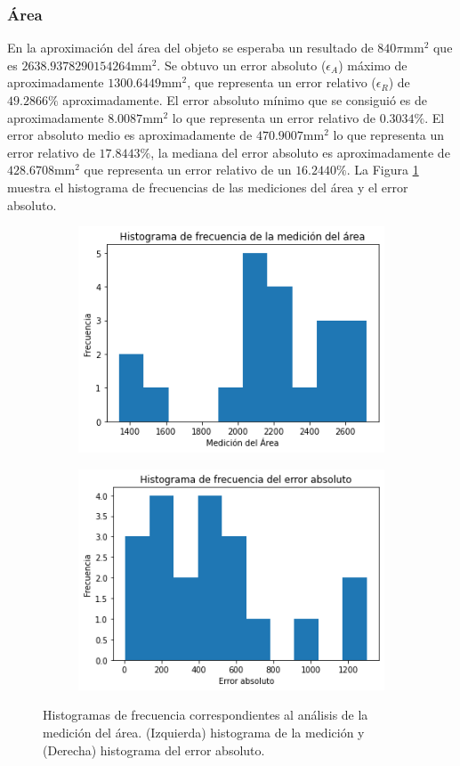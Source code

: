 \subsubsection{Área}

En la aproximación del área del objeto se esperaba un resultado de $840\pi\text{mm}^2$ que es $2638.9378290154264\text{mm}^2$. Se obtuvo un error absoluto ($\epsilon_A$) máximo de aproximadamente $1300.6449\text{mm}^2$, que representa un error relativo ($\epsilon_R$) de $49.2866\%$ aproximadamente. El error absoluto mínimo que se consiguió es de aproximadamente $8.0087\text{mm}^2$ lo que representa un error relativo de $0.3034\%$. El error absoluto medio es aproximadamente de $470.9007\text{mm}^2$ lo que representa un error relativo de $17.8443\%$, la mediana del error absoluto es aproximadamente de $428.6708\text{mm}^2$ que representa un error relativo de un $16.2440\%$. La Figura \ref{fig:histA} muestra el histograma de frecuencias de las mediciones del área y el error absoluto.

\begin{figure}[ht]
	\centering
	\begin{subfigure}
		\centering
		\includegraphics[width=.49\linewidth]{./Graphics/histA.png}
	\end{subfigure}
	\begin{subfigure}
		\centering
		\includegraphics[width=.49\linewidth]{./Graphics/histAEA.png}
	\end{subfigure}
	\caption{Histogramas de frecuencia correspondientes al análisis de la medición del área. (Izquierda) histograma de la medición y (Derecha) histograma del error absoluto.}
	\label{fig:histA}
\end{figure}


